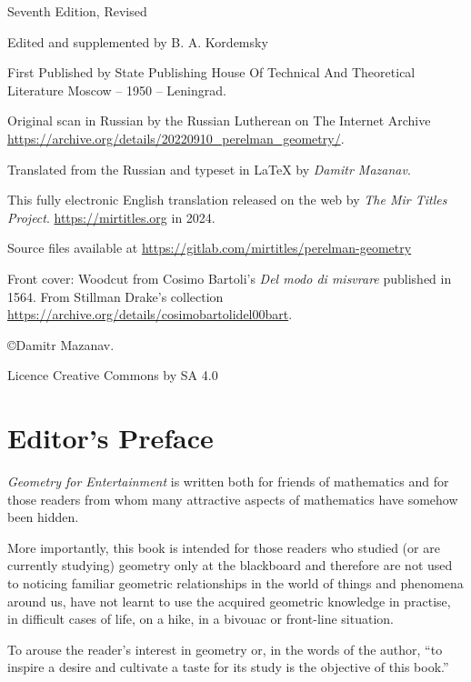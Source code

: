 {\noindent
Seventh Edition, Revised

Edited and supplemented by B. A. Kordemsky

First Published by State Publishing House Of Technical And Theoretical Literature Moscow -- 1950 -- Leningrad.

Original scan in Russian by the Russian Lutherean on The Internet Archive \url{https://archive.org/details/20220910_perelman_geometry/}.

Translated from the Russian and typeset in \LaTeX{} by \emph{Damitr Mazanav}.



This fully electronic English translation released on the web by \emph{The Mir Titles Project}. \url{https://mirtitles.org} in 2024.

Source files available at \url{https://gitlab.com/mirtitles/perelman-geometry}
 
Front cover: Woodcut from Cosimo Bartoli's \emph{Del modo di misvrare} published in 1564. From Stillman Drake's collection \url{https://archive.org/details/cosimobartolidel00bart}.

\copyright Damitr Mazanav.

Licence Creative Commons by SA 4.0



\cleardoublepage

 \tableofcontents
 
 \cleardoublepage

\chapter{Editor's Preface}
\label{editor-preface}


\emph{Geometry for Entertainment} is written both for friends of mathematics and for those readers from whom many attractive aspects of mathematics have somehow been hidden.

More importantly, this book is intended for those readers who studied (or are currently studying) geometry only at the blackboard and therefore are not used to noticing familiar geometric relationships in the world of things and phenomena around us, have not learnt to use the acquired geometric knowledge in practise, in difficult cases of life, on a hike, in a bivouac or front-line situation.

To arouse the reader's interest in geometry or, in the words of the author, ``to inspire a desire and cultivate a taste for its study is the objective of this book.''

}
